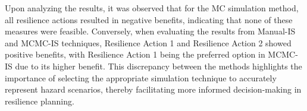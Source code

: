     

    Upon analyzing the results, it was observed that for the MC simulation method, all resilience actions resulted in negative benefits, indicating that none of these measures were feasible. Conversely, when evaluating the results from Manual-IS and MCMC-IS techniques, Resilience Action 1 and Resilience Action 2 showed positive benefits, with Resilience Action 1 being the preferred option in MCMC-IS due to its higher benefit. This discrepancy between the methods highlights the importance of selecting the appropriate simulation technique to accurately represent hazard scenarios, thereby facilitating more informed decision-making in resilience planning.
    